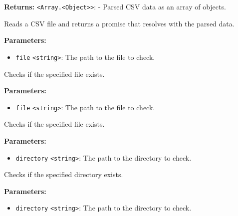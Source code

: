\documentclass[12pt,a4paper]{article}
\begin{document}
\noindent \textbf{Returns:} \texttt{<Array.<Object>>}: - Parsed CSV data as an array of objects.

\noindent Reads a CSV file and returns a promise that resolves with the parsed data.

\vspace{5mm}
\noindent {}


\noindent \textbf{Parameters:}
\begin{itemize}
  \item \texttt{file} \texttt{<string>}: The path to the file to check.
\end{itemize}

\noindent Checks if the specified file exists.

\vspace{5mm}
\noindent {}


\noindent \textbf{Parameters:}
\begin{itemize}
  \item \texttt{file} \texttt{<string>}: The path to the file to check.
\end{itemize}

\noindent Checks if the specified file exists.

\vspace{5mm}
\noindent {}


\noindent \textbf{Parameters:}
\begin{itemize}
  \item \texttt{directory} \texttt{<string>}: The path to the directory to check.
\end{itemize}

\noindent Checks if the specified directory exists.

\vspace{5mm}
\noindent {}


\noindent \textbf{Parameters:}
\begin{itemize}
  \item \texttt{directory} \texttt{<string>}: The path to the directory to check.
\end{itemize}
\end{document}
